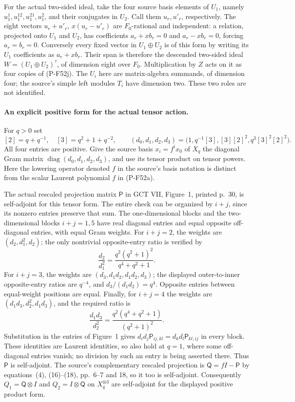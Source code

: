 \documentclass[11pt,a4paper]{article}
\begin{document}
For the actual two-sided ideal, take the four source basis elements
of $U_1$, namely $u_1^1,u_1^{12},u_1^{21},u_1^2$, and their
conjugates in $U_2$. Call them $u_r,u'_r$, respectively.
The eight vectors $u_r+u'_r$, $x(u_r-u'_r)$ are $F_0$-rational
and independent: a relation, projected onto $U_1$ and $U_2$,
has coefficients $a_r+xb_r=0$ and $a_r-xb_r=0$, forcing
$a_r=b_r=0$. Conversely every fixed vector in
$U_1\oplus U_2$ is of this form by writing its $U_1$ coefficients
as $a_r+xb_r$. Their span is therefore the descended two-sided
ideal $W=(U_1\oplus U_2)^\tau$, of dimension eight over $F_0$.
Multiplication by $Z$ acts on it as four copies of (P-F52j).
The $U_i$ here are matrix-algebra summands, of dimension four;
the source's simple left modules $T_i$ have dimension two.
These two roles are not identified.

\paragraph{An explicit positive form for the actual tensor action.}
For $q>0$ set
\[
 [2]=q+q^{-1},\quad [3]=q^2+1+q^{-2},\qquad
 (d_0,d_1,d_2,d_3)
       =\bigl(1,q^{-1}[3],[3][2]^2,q^3[3]^2[2]^2\bigr).
                                                               \tag{P-F52k}
\]
All four entries are positive. Give the source basis
$x_i=f^ix_0$ of $X_q$ the diagonal Gram matrix
$\operatorname{diag}(d_0,d_1,d_2,d_3)$, and use its tensor
product on tensor powers. Here the lowering operator denoted
$f$ in the source's basis notation is distinct from the scalar
Laurent polynomial $f$ in (P-F52a).

The actual rescaled projection matrix $\mathsf P$ in GCT VII,
Figure~1, printed p.~30, is self-adjoint for this tensor form.
The entire check can be organized by $i+j$, since its nonzero
entries preserve that sum. The one-dimensional blocks and the
two-dimensional blocks $i+j=1,5$ have real diagonal entries
and equal opposite off-diagonal entries, with equal Gram weights.
For $i+j=2$, the weights are $(d_2,d_1^2,d_2)$; the only
nontrivial opposite-entry ratio is verified by
\[
 \frac{d_2}{d_1^2}
       =\frac{q^2(q^2+1)^2}{q^4+q^2+1}.
\]
For $i+j=3$, the weights are
$(d_3,d_1d_2,d_1d_2,d_3)$; the displayed outer-to-inner
opposite-entry ratios are $q^{-4}$, and
$d_3/(d_1d_2)=q^4$. Opposite entries between equal-weight
positions are equal. Finally, for $i+j=4$ the weights are
$(d_1d_3,d_2^2,d_1d_3)$, and the required ratio is
\[
 \frac{d_1d_3}{d_2^2}
       =\frac{q^2(q^4+q^2+1)}{(q^2+1)^2}.
\]
Substitution in the entries of Figure~1 gives
$d_id_j\mathsf P_{ij,kl}=d_kd_l\mathsf P_{kl,ij}$
in every block. These identities are Laurent identities,
so also hold at $q=1$, where some off-diagonal entries vanish;
no division by such an entry is being asserted there.
Thus $\mathsf P$ is self-adjoint. The source's complementary
rescaled projection is $\mathsf Q=fI-\mathsf P$ by
equations~(4), (16)--(18), pp.~6--7 and 18, so it too is
self-adjoint. Consequently $Q_1=\mathsf Q\otimes I$ and
$Q_2=I\otimes\mathsf Q$ on $X_q^{\otimes3}$ are
self-adjoint for the displayed positive product form.
\end{document}
